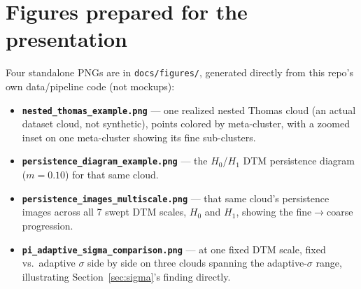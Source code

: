 \documentclass[11pt]{article}
\begin{document}
\section{Figures prepared for the presentation}

Four standalone PNGs are in \texttt{docs/figures/}, generated directly from this
repo's own data/pipeline code (not mockups):

\begin{itemize}
  \item \textbf{\texttt{nested\_thomas\_example.png}} --- one realized nested
    Thomas cloud (an actual dataset cloud, not synthetic), points colored by
    meta-cluster, with a zoomed inset on one meta-cluster showing its fine
    sub-clusters.
  \item \textbf{\texttt{persistence\_diagram\_example.png}} --- the $H_0$/$H_1$
    DTM persistence diagram ($m=0.10$) for that same cloud.
  \item \textbf{\texttt{persistence\_images\_multiscale.png}} --- that same
    cloud's persistence images across all 7 swept DTM scales, $H_0$ and $H_1$,
    showing the fine$\to$coarse progression.
  \item \textbf{\texttt{pi\_adaptive\_sigma\_comparison.png}} --- at one fixed
    DTM scale, fixed vs.\ adaptive $\sigma$ side by side on three clouds spanning
    the adaptive-$\sigma$ range, illustrating Section~\ref{sec:sigma}'s finding
    directly.
\end{itemize}
\end{document}
